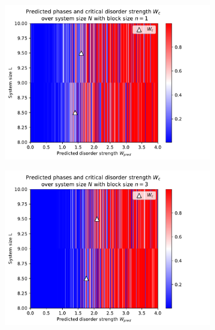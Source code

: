 \documentclass[reprint,amsmath,amssymb,aps,prb]{revtex4-2}
\begin{document}
\onecolumngrid
\begin{center}
	\begin{figure}[H]
		\centering	
		\begin{subfigure}[c]{0.45\textwidth}
			\includegraphics[width=\textwidth]{../results/Wc/n1_Wc_N_dependency.pdf}
		\end{subfigure}
		\begin{subfigure}[c]{0.45\textwidth}
			\includegraphics[width=\textwidth]{../results/Wc/n3_Wc_N_dependency.pdf}
		\end{subfigure}
		\begin{subfigure}[c]{0.45\textwidth}

\end{subfigure}
\end{figure}
\end{center}
\end{document}

